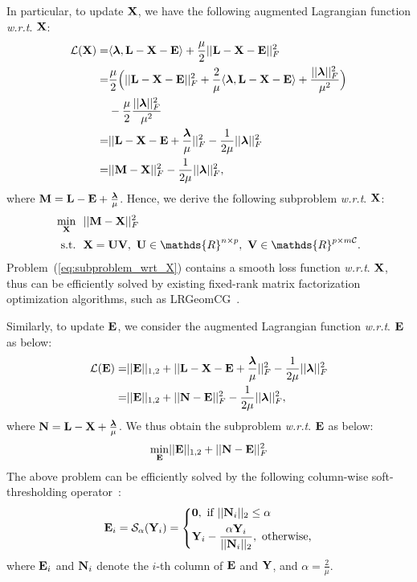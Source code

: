 \documentclass[letterpaper]{article}
\def\bN{{\bf N}}
\def\bM{{\bf M}}
\def\bE{{\bf E}}
\def\blambda{{\bm \lambda}}
\def\calL{{\mathcal{L}}}
\def\calC{{\mathcal{C}}}
\def\calS{{\mathcal{S}}}
\def\bL{{\bf L}}
\def\bU{{\bf U}}
\def\bV{{\bf V}}
\def\dsR{\mathds{R}}
\def\bX{{\bf X}}
\def\bX{{\bf X}}
\def\bY{{\bf Y}}
\def\zerocolumn{{\bf 0}}
\def\st{{\text{s.t.}}}
\def\wrt{\emph{w.r.t}}
\begin{document}
In particular, to update $\bX$, we have the following augmented Lagrangian function \wrt. $\bX$:
\begin{align}\label{eq:langrangian_wrt_X}
  \calL (\bX) = & \langle \blambda, \bL - \bX - \bE \rangle + \frac{\mu}{2} || \bL - \bX - \bE ||_F^2  \nonumber  \\
              = & \frac{\mu}{2} \Big( || \bL - \bX - \bE ||_F^2 + \frac{2}{\mu} \langle \blambda, \bL - \bX - \bE \rangle + \frac{|| \blambda ||_F^2}{\mu^2} \Big)    \nonumber   \\
                & - \frac{\mu}{2} \frac{|| \blambda ||_F^2}{\mu^2}   \nonumber \\
              = & || \bL - \bX - \bE + \frac{\blambda}{\mu} ||_F^2 - \frac{1}{2\mu}|| \blambda ||_F^2   \nonumber \\
              = & || \bM - \bX ||_F^2 - \frac{1}{2\mu}|| \blambda ||_F^2   ,
\end{align}
\noindent
where $\bM = \bL - \bE + \frac{\blambda}{\mu}$.
Hence, we derive the following subproblem \wrt. $\bX$:
\begin{align}\label{eq:subproblem_wrt_X}
  \min_{\bX} ~&~ || \bM - \bX ||_F^2    \nonumber \\
  \st        ~&~ \bX = \bU \bV,~\bU \in \dsR^{n \times p},~\bV \in \dsR^{p \times m\calC}   .
\end{align}
Problem~(\ref{eq:subproblem_wrt_X}) contains a smooth loss function \wrt. $\bX$, thus can be efficiently solved by existing fixed-rank matrix factorization optimization algorithms, such as LRGeomCG~\cite{vandereycken2013lowrank}.




Similarly, to update $\bE$, we consider the augmented Lagrangian function \wrt. $\bE$ as below:
\begin{align}\label{eq:subproblem_wrt_E_1}
  \calL (\bE) = & || \bE ||_{1,2} + || \bL - \bX - \bE + \frac{\blambda}{\mu} ||_F^2 -\frac{1}{2\mu}|| \blambda ||_F^2  \nonumber \\
              = & || \bE ||_{1,2} + || \bN - \bE ||_F^2 - \frac{1}{2\mu}|| \blambda ||_F^2   ,
\end{align}
\noindent
where $\bN = \bL - \bX + \frac{\blambda}{\mu}$.
We thus obtain the subproblem \wrt. $\bE$ as below:
\begin{align}\label{eq:subproblem_wrt_E_2}
  \min_{\bE} & || \bE ||_{1,2} + || \bN - \bE ||_F^2 \\
\end{align}
\noindent
The above problem can be efficiently solved by the following column-wise soft-thresholding operator~\cite{xiao2015FaLRR}:
\begin{align}\label{eq:column_wise_soft_thresholding}
  \bE_{i} = \calS_{\alpha}(\bY_{i}) = \left\{
    \begin{aligned}
      & \zerocolumn,~\text{if}~ ||\bN_{i}||_2 \leq \alpha   \\
      & \bY_{i} - \frac{\alpha \bY_{i}}{|| \bN_{i} ||_2},~\text{otherwise,}
    \end{aligned}
    \right.
\end{align}
\noindent
where $\bE_{i}$ and $\bN_{i}$ denote the $i$-th column of $\bE$ and $\bY$,
and $\alpha = \frac{2}{\mu}$.
\end{document}
